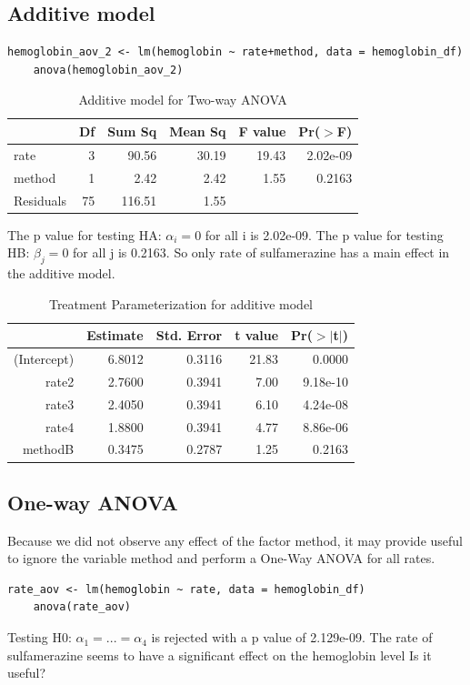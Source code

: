 \documentclass{article}
\begin{document}
\subsection{Additive model}
\begin{lstlisting}[caption="Additive model for Two-Way ANOVA", label={lst:Add}]
    hemoglobin_aov_2 <- lm(hemoglobin ~ rate+method, data = hemoglobin_df)
    anova(hemoglobin_aov_2) 
\end{lstlisting}

\begin{table}[ht]
\caption{Additive model for Two-way ANOVA}
\label{tab:add}
\centering
\begin{tabular}{lrrrrr}
  \hline
 & Df & Sum Sq & Mean Sq & F value & Pr($>$F) \\ 
  \hline
rate & 3 & 90.56 & 30.19 & 19.43 & 2.02e-09 \\ 
  method & 1 & 2.42 & 2.42 & 1.55 & 0.2163 \\ 
  Residuals & 75 & 116.51 & 1.55 &  &  \\ 
   \hline
\end{tabular}
\end{table}

The p value for testing HA: $\alpha_i = 0$ for all i is 2.02e-09.
The p value for testing HB: $\beta_j = 0$ for all j is 0.2163.
So only rate of sulfamerazine has a main effect in the additive model.

\begin{table}[ht]
\caption{Treatment Parameterization for additive model}
\label{tab:treatment_add}
\centering
\begin{tabular}{rrrrr}
  \hline
 & Estimate & Std. Error & t value & Pr($>$$|$t$|$) \\ 
  \hline
(Intercept) & 6.8012 & 0.3116 & 21.83 & 0.0000 \\ 
  rate2 & 2.7600 & 0.3941 & 7.00 & 9.18e-10 \\ 
  rate3 & 2.4050 & 0.3941 & 6.10 & 4.24e-08 \\ 
  rate4 & 1.8800 & 0.3941 & 4.77 & 8.86e-06 \\ 
  methodB & 0.3475 & 0.2787 & 1.25 & 0.2163 \\ 
   \hline
\end{tabular}
\end{table}

\subsection{One-way ANOVA}
Because we did not observe any effect of the factor method, it may provide useful to ignore the variable method and perform a One-Way ANOVA for all rates. 
\begin{lstlisting}[caption="One-Way ANOVA", label={lst:owa}]
    rate_aov <- lm(hemoglobin ~ rate, data = hemoglobin_df)
    anova(rate_aov)
\end{lstlisting}
Testing H0: $\alpha_1=...=\alpha_4$ is rejected with a p value of 2.129e-09.
The rate of sulfamerazine seems to have a significant effect on the hemoglobin level
Is it useful?
\end{document}

